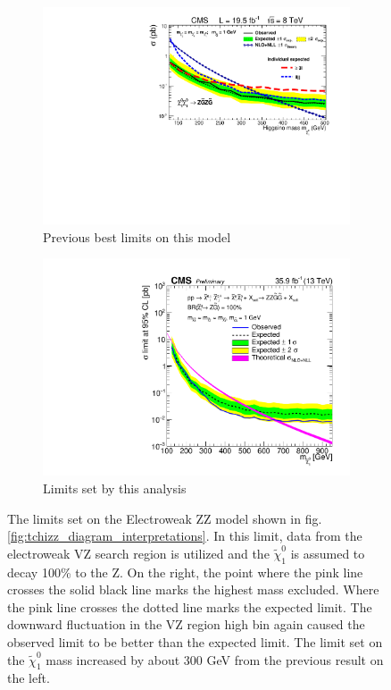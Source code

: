     \begin{figure}[!h]
      \centering
        \begin{subfigure}[b]{0.4\textwidth}
          \label{fig:t5zz_interpretations_2015}
          \includegraphics[width=\textwidth]{figures/interpretations/TChiZZ_previous_best.pdf}
          \caption{Previous best limits on this model}
        \end{subfigure}
        \begin{subfigure}[b]{0.4\textwidth}
          \label{fig:t5zz_interpretations_current}
          \includegraphics[width=\textwidth]{figures/interpretations/TChiZZ_Exclusion_13TeV.pdf}
          \caption{Limits set by this analysis}
        \end{subfigure}
      \caption[The limits set on the Electroweak ZZ model.]{ \label{fig:tchizz_interpretation}
        The limits set on the Electroweak ZZ model shown in fig. \ref{fig:tchizz_diagram_interpretations}. In this limit, data from the electroweak VZ search region is utilized and the $\widetilde{\chi}^0_1$ is assumed to decay 100\% to the Z. On the right, the point where the pink line crosses the solid black line marks the highest mass excluded. Where the pink line crosses the dotted line marks the expected limit. The downward fluctuation in the VZ region high \MET bin again caused the observed limit to be better than the expected limit. The limit set on the $\widetilde{\chi}^0_1$ mass increased by about 300 GeV from the previous result on the left.
      }
    \end{figure}

